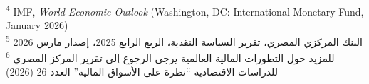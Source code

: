 \textsuperscript{4} IMF, \textit{World Economic Outlook} (Washington, DC: International Monetary Fund, January 2026)\\
\textsuperscript{5} البنك المركزي المصري، تقرير السياسة النقدية، الربع الرابع 2025، إصدار مارس 2026\\
\textsuperscript{6} للمزيد حول التطورات المالية العالمية يرجى الرجوع إلى تقرير المركز المصري للدراسات الاقتصادية ``نظرة على الأسواق المالية'' العدد 26 (2026)
